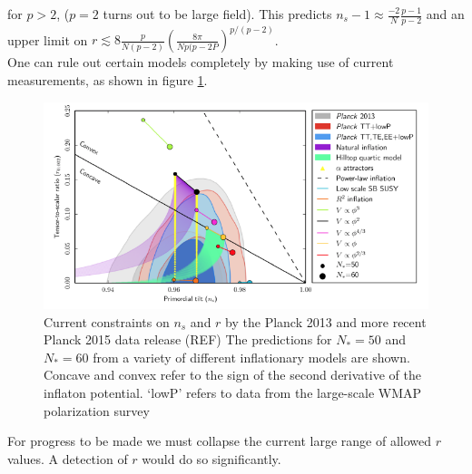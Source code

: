 \documentclass[a4paper,10pt]{article}
\begin{document}
for $p>2$, ($p=2$ turns out to be large field). This predicts $n_s-1 \approx \frac{-2}{N}\frac{p-1}{p-2}$ and an upper limit on $r\lesssim 8\frac{p}{N(p-2)}(\frac{8\pi}{Np(p-2P})^{p/(p-2)}$.\\


One can rule out certain models completely by making use of current measurements, as shown in figure \ref{inflationconstraints}. 

\begin{figure}[h]
  \includegraphics[width=\linewidth]{modeldepconstraints.png}
  \caption{Current constraints on $n_s$ and $r$ by the Planck 2013 and more recent Planck 2015 data release (REF) The predictions for $N_*=50$ and $N_*=60$ from a variety of different inflationary models are shown. Concave and convex refer to the sign of the second derivative of the inflaton potential. `lowP' refers to data from the large-scale WMAP polarization survey}
\label{inflationconstraints}  
\end{figure}

For progress to be made we must collapse the current large range of allowed $r$ values. A detection of $r$ would do so significantly.
\end{document}
